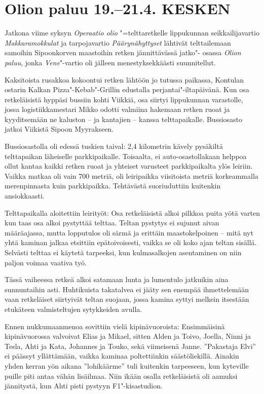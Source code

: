
\section{Olion paluu 19.--21.4. KESKEN}

\begin{multicols}{2}

	\noindent Jatkona viime syksyn \textit{Operaatio olio} "=telttaretkelle lippukunnan
	seikkailijavartio \textit{Makkaramokkulat} ja tarpojavartio \textit{Päärynähyttyset} lähtivät
	telttailemaan samoihin Sipoonkorven maastoihin retken jännittävässä jatko"-
	osassa \textit{Olion paluu}, jonka \textit{Vene}"-vartio oli jälleen menestyksekkäästi
	suunnitellut.

	Kaksitoista rusakkoa kokoontui retken lähtöön jo tutussa paikassa,
	Kontulan ostarin Kalkan Pizza"-Kebab"-Grillin edustalla
	perjantai"-iltapäivänä. Kun osa retkeläisistä hyppäsi bussiin kohti
	Viikkiä, osa siirtyi lippukunnan varastolle, jossa logistiikkamestari
	Mikko odotti valmiina hakemaan retken ruoat ja kyyditsemään ne kaluston
	-- ja kantajien -- kanssa telttapaikalle. Bussiosasto jatkoi Viikistä
	Sipoon Myyrakseen. 

	Bussiosastolla oli edessä tuskien taival: 2,4 kilometrin kävely
	pysäkiltä telttapaikan läheiselle parkkipaikalle. Toisaalta, ei
	auto-osastollakaan helppoa ollut kantaa kaikki retken ruoat ja yhteiset
	varusteet parkkipaikalta ylös leiriin. Vaikka matkaa oli vain 700
	metriä, oli leiripaikka viisitoista metriä korkeammalla merenpinnasta
	kuin parkkipaikka. Tehtävästä suoriuduttiin kuitenkin ansiokkaasti.

	Telttapaikalla aloitettiin leirityöt: Osa retkeläisistä alkoi pilkkoa
	puita yötä varten kun taas osa alkoi pystyttää telttaa. Teltan pystytys
	ei sujunut aivan määräajassa, mutta lopputulos oli särmä ja erittäin
	maastokelpoinen -- mitä nyt yhtä kaminan jalkaa etsittiin
	epätoivoisesti, vaikka se oli koko ajan teltan sisällä. Selvästi
	telttaa ei käytetä tarpeeksi, kun kulmasalkojen asentaminen on niin
	paljon voimaa vaativa työ.

	Tässä vaiheessa retkeä alkoi satamaan lunta ja lumentulo jatkuikin aina
	sunnuntaihin asti. Huhtikuista takatalvea ei jääty sen enempää
	ihmettelemään vaan retkeläiset siirtyivät teltan suojaan, jossa kamina
	syttyi melkein itsestään etukäteen valmisteltujen sytykkeiden avulla. 

	Ennen nukkumaanmenoa sovittiin vielä kipinävuoroista: Ensimmäisinä
	kipinävuorossa valvoivat Elias ja Mikael, sitten Alden ja Toivo,
	Joella, Ninni ja Tesla, Ahti ja Kata, Johannes ja Touko, sekä
	viimeisenä Janne. ''Pakastaja Elvi'' ei päässyt yllättämään, vaikka
	kaminaa poltettiinkin säästöliekillä. Ainakin yhden kerran yön aikana
	''lohikäärme'' tuli kuitenkin tarpeeseen, kun kyteville puille piti antaa
	vähän lisäilmaa. Niin ikään osalla retkeläisistä oli aamuksi
	jännitystä, kun Ahti pisti pystyyn F1"-kisastudion.


\end{multicols}
